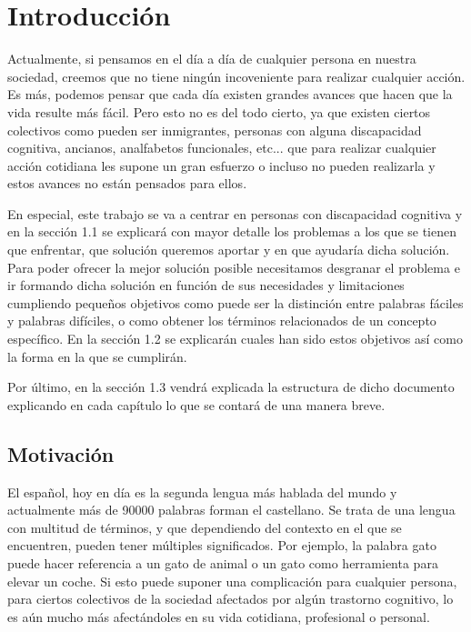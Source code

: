 \chapter{Introducción}
\label{cap:introduccion}

Actualmente, si pensamos en el día a día de cualquier persona en nuestra sociedad, creemos que no tiene ningún incoveniente para realizar cualquier acción. Es más, podemos pensar que cada día existen grandes avances que hacen que la vida resulte más fácil.
Pero esto no es del todo cierto, ya que existen ciertos colectivos como pueden ser inmigrantes, personas con alguna discapacidad cognitiva, ancianos, analfabetos funcionales, etc... que para realizar cualquier acción cotidiana les supone un gran esfuerzo o incluso no pueden realizarla y estos avances no están pensados para ellos.

En especial, este trabajo se va a centrar en personas con discapacidad cognitiva y en la sección 1.1 se explicará con mayor detalle los problemas a los que se tienen que enfrentar, que solución queremos aportar y en que ayudaría dicha solución.
Para poder ofrecer la mejor solución posible necesitamos desgranar el problema e ir formando dicha solución en función de sus necesidades y limitaciones cumpliendo pequeños objetivos como puede ser la distinción entre palabras fáciles y palabras difíciles, o como obtener los términos relacionados de un concepto específico. En la sección 1.2 se explicarán cuales han sido estos objetivos así como la forma en la que se cumplirán.

Por último, en la sección 1.3 vendrá explicada la estructura de dicho documento explicando en cada capítulo lo que se contará de una manera breve.





	


\section{Motivación}
\label{cap:sec:motivacion}

El español, hoy en día es la segunda lengua más hablada del mundo y actualmente más de 90000 palabras forman el castellano. 
Se trata de una lengua con multitud de términos, y que dependiendo del contexto en el que se encuentren, pueden tener múltiples significados. Por ejemplo, la palabra gato puede hacer referencia a un gato de animal o un gato como herramienta para elevar un coche.
Si esto puede suponer una complicación para cualquier persona, para ciertos colectivos de la sociedad afectados por algún trastorno cognitivo, lo es aún mucho más afectándoles en su vida cotidiana, profesional o personal. 

